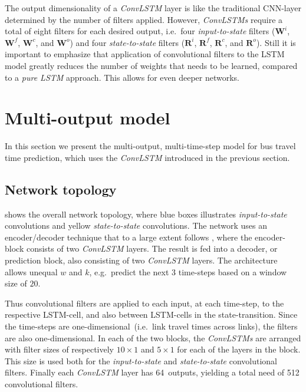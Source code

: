 ﻿\documentclass[preprint,11pt,5p,twocolumn]{elsarticle}
\newcommand{\matr}[1]{\mathbf{#1}}
\begin{document}
The output dimensionality of a \emph{ConvLSTM} layer is like the traditional CNN-layer determined by the number of filters applied. However, \emph{ConvLSTMs} require a total of eight filters for each desired output, i.e.\ four \emph{input-to-state} filters ($\matr{W}^i$, $\matr{W}^f$, $\matr{W}^c$, and $\matr{W}^o$) and four \emph{state-to-state} filters ($\matr{R}^i$, $\matr{R}^f$, $\matr{R}^c$, and $\matr{R}^o$).
Still it is important to emphasize that application of convolutional filters to the LSTM model greatly reduces the number of weights that needs to be learned, compared to a \emph{pure LSTM} approach. This allows for even deeper networks.

\section{Multi-output model}
\label{sec:model}
In this section we present the multi-output, multi-time-step model for bus travel time prediction, which uses the \emph{ConvLSTM} introduced in the previous section.

\subsection{Network topology}


 shows the overall network topology, where blue boxes illustrates \emph{input-to-state} convolutions and yellow \emph{state-to-state} convolutions. The network uses an encoder/decoder technique that to a large extent follows \cite{ConvLSTM}, where the encoder-block consists of two \emph{ConvLSTM} layers. The result is fed into a decoder, or prediction block, also consisting of two \emph{ConvLSTM} layers. The architecture allows unequal $w$ and $k$, e.g.\ predict the next $3$ time-steps based on a window size of $20$.

Thus convolutional filters are applied to each input, at each time-step, to the respective LSTM-cell, and also between LSTM-cells in the state-transition. Since the time-steps are one-dimensional~(i.e.\ link travel times across links), the filters are also one-dimensional. In each of the two blocks, the \emph{ConvLSTMs} are arranged with filter sizes of respectively $10\times1$ and $5\times1$ for each of the layers in the block. This size is used both for the \emph{input-to-state} and \emph{state-to-state} convolutional filters. Finally each \emph{ConvLSTM} layer has 64~outputs, yielding a total need of 512 convolutional filters.
\end{document}
